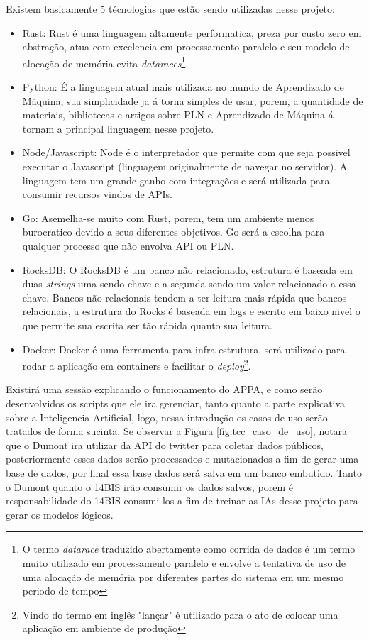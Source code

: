 Existem basicamente 5 técnologias que estão sendo utilizadas nesse projeto:
\begin{itemize}
 \item Rust: Rust é uma linguagem altamente performatica, preza por custo zero em abstração, atua com excelencia em processamento paralelo e seu modelo de alocação de memória evita \textit{dataraces}\footnote{O termo \textit{datarace} traduzido abertamente como corrida de dados é um termo muito utilizado em processamento paralelo e envolve a tentativa de uso de uma alocação de memória por diferentes partes do sistema em um mesmo periodo de tempo}.
 \item Python: É a linguagem atual mais utilizada no mundo de Aprendizado de Máquina, sua simplicidade ja á torna simples de usar, porem, a quantidade de materiais, bibliotecas e artigos sobre PLN e Aprendizado de Máquina á tornam a principal linguagem nesse projeto.
 \item Node/Javascript: Node é o interpretador que permite com que seja possivel executar o Javascript (linguagem originalmente de navegar no servidor). A linguagem tem um grande ganho com integrações e será utilizada para consumir recursos vindos de APIs.
 \item Go: Asemelha-se muito com Rust, porem, tem um ambiente menos burocratico devido a seus diferentes objetivos. Go será a escolha para qualquer processo que não envolva API ou PLN.
 \item RocksDB: O RocksDB é um banco não relacionado, estrutura é baseada em duas \textit{strings} uma sendo chave e a segunda sendo um valor relacionado a essa chave. Bancos não relacionais tendem a ter leitura mais rápida que bancos relacionais, a estrutura do Rocks é baseada em logs e escrito em baixo nivel o que permite sua escrita ser tão rápida quanto sua leitura.
 \item Docker: Docker é uma ferramenta para infra-estrutura, será utilizado para rodar a aplicação em containers e facilitar o \textit{deploy}\footnote{Vindo do termo em inglês "lançar" é utilizado para o ato de colocar uma aplicação em ambiente de produção}.
\end{itemize}

Existirá uma sessão explicando o funcionamento do APPA, e como serão desenvolvidos os scripts que ele ira gerenciar, tanto quanto a parte explicativa sobre a Inteligencia Artificial, logo, nessa introdução os casos de uso serão tratados de forma sucinta. Se observar a Figura \ref{fig:tcc_caso_de_uso}, notara que o Dumont ira utilizar da API do twitter para coletar dados públicos, posteriormente esses dados serão processados e mutacionados a fim de gerar uma base de dados, por final essa base dados será salva em um banco embutido. Tanto o Dumont quanto o 14BIS irão consumir os dados salvos, porem é responsabilidade do 14BIS consumi-los a fim de treinar as IAs desse projeto para gerar os modelos lógicos.


